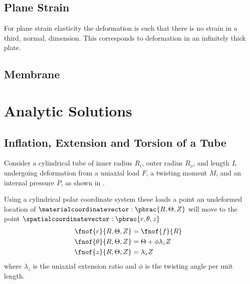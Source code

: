 \subsection{Plane Strain}
\label{subsec:FiniteElasticityPlaneStrain}

For plane strain elasticity the deformation is such that there is no
strain in a third, normal, dimension. This corresponds to deformation
in an infinitely thick plate.

\subsection{Membrane}
\label{subsec:FiniteElasticityMembrane}

\subsection{\Onedal}
\label{subsec:FiniteElasticityOneDimension}

\section{Analytic Solutions}
\label{sec:FiniteElasticityAnalyticSolutions}

\subsection{Inflation, Extension and Torsion of a Tube}
\label{subsec:FiniteElasticityAnalyticSolutionTube}

Consider a cylindrical tube of inner radius $R_{i}$, outer radius
$R_{o}$, and length $L$ undergoing deformation from a uniaxial load
$F$, a twisting moment $M$, and an internal pressure $P$, as shown in
.


Using a cylindrical polar coordinate system these loads a point an
undeformed location of $\materialcoordinatevector:\pbrac{R,\Theta,Z}$
will move to the point $\spatialcoordinatevector:\pbrac{r,\theta,z}$
\ie
\begin{align}
  \fnof{r}{R,\Theta,Z}&=\fnof{f}{R} \\
  \fnof{\theta}{R,\Theta,Z}&=\Theta+\phi\lambda_{z} Z \\
  \fnof{z}{R,\Theta,Z}&=\lambda_{z} Z
\end{align}
where $\lambda_{z}$ is the uniaxial extension ratio and $\phi$ is the twisting angle per unit length.


